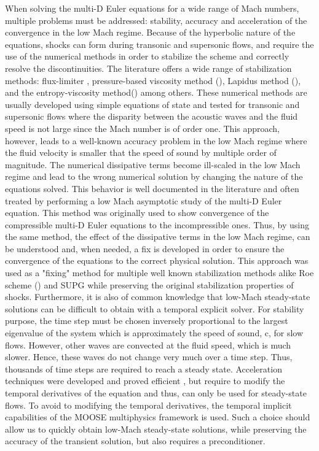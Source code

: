 \documentclass[preprint,10pt]{elsarticle}
\begin{document}
When solving the multi-D Euler equations for a wide range of Mach numbers, multiple problems must be addressed: stability, accuracy and acceleration of the convergence in the low Mach regime. Because of the hyperbolic nature of the equations, shocks can form during transonic and supersonic flows, and require the use of the numerical methods in order to stabilize the scheme and correctly resolve the discontinuities. The literature offers a wide range of stabilization methods: flux-limiter \cite{FluxLimiter, FluxLimiter2}, pressure-based viscosity method (\cite{PBV_book}), Lapidus method (\cite{Lapidus_paper, LMP, Lapidus_book}), and the entropy-viscosity method(\cite{jlg1, jlg2}) among others. These numerical methods are usually developed using simple equations of state and tested for transonic and supersonic flows where the disparity between the acoustic waves and the fluid speed is not large since the Mach number is of order one. This approach, however, leads to a well-known accuracy problem in the low Mach regime where the fluid velocity is smaller that the speed of sound by multiple order of magnitude. The numerical dissipative terms become ill-scaled in the low Mach regime and lead to the wrong numerical solution by changing the nature of the equations solved. This behavior is well documented in the literature \cite{LowMach1, LowMach2, LowMach3} and often treated by performing a low Mach asymptotic study of the multi-D Euler equation. This method was originally used \cite{LowMach1} to show convergence of the compressible multi-D Euler equations to the incompressible ones. Thus, by using the same method, the effect of the dissipative terms in the low Mach regime, can be understood and, when needed, a fix is developed in order to ensure the convergence of the equations to the correct physical solution. This approach was used as a "fixing" method for multiple well known stabilization methods alike Roe scheme (\cite{Roe}) and SUPG \cite{LowMach3} while preserving the original stabilization properties of shocks. Furthermore, it is also of common knowledge that low-Mach steady-state solutions can be difficult to obtain with a temporal explicit solver. For stability purpose, the time step must be chosen inversely proportional to the largest eigenvalue of the system which is approximately the speed of sound, c, for slow flows. However, other waves are convected at the fluid speed, which is much slower. Hence, these waves do not change very much over a time step. Thus, thousands of time steps are required to reach a steady state. Acceleration techniques were developed and proved efficient \cite{LowMach2}, but require to modify the temporal derivatives of the equation and thus, can only be used for steady-state flows. To avoid to modifying the temporal derivatives, the temporal implicit capabilities of the MOOSE multiphysics framework \cite{MOOSE} is used. Such a choice should allow us to quickly obtain low-Mach steady-state solutions, while preserving the accuracy of the transient solution, but also requires a preconditioner.\\
\end{document}
